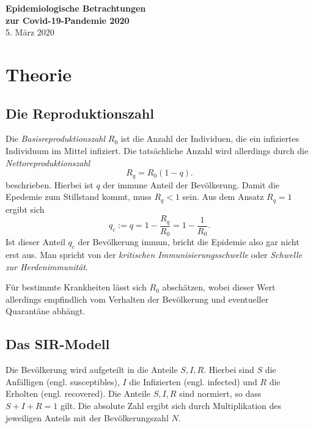 \documentclass[a4paper,11pt,fleqn,twocolumn,twoside,dvipdfmx]{scrartcl}
\numberwithin{equation}{section}
\begin{document}
\noindent
{\Large\textbf{Epidemiologische Betrachtungen\\
zur Covid-19-Pandemie 2020}}\\[4pt]
5. März 2020

\tableofcontents

\section{Theorie}

\subsection{Die Reproduktionszahl}

Die \emph{Basisreproduktionszahl} $R_0$ ist die Anzahl der Individuen,
die ein infiziertes Individuum im Mittel infiziert. Die tatsächliche
Anzahl wird allerdings durch die \emph{Nettoreproduktionszahl}%
\begin{equation}\label{eq:Nettoreproduktionszahl}
R_q = R_0(1-q).
\end{equation}
beschrieben. Hierbei ist $q$ der immune Anteil der Bevölkerung.
Damit die Epedemie zum Stillstand kommt, muss $R_q<1$ sein.
Aus dem Ansatz $R_q=1$ ergibt sich%
\begin{equation}
q_c := q = 1-\frac{R_q}{R_0} = 1-\frac{1}{R_0}.
\end{equation}
Ist dieser Anteil $q_c$ der Bevölkerung immun, bricht die Epidemie
also gar nicht erst aus. Man spricht von der
\emph{kritischen Immunisierungsschwelle} oder \emph{Schwelle
zur Herdenimmunität}.

Für bestimmte Krankheiten lässt sich $R_0$ abschätzen, wobei
dieser Wert allerdings empfindlich vom Verhalten der Bevölkerung und
eventueller Quarantäne abhängt.


\subsection{Das SIR-Modell}

Die Bevölkerung wird aufgeteilt in die Anteile $S,I,R$. Hierbei sind
$S$ die Anfälligen (engl. susceptibles), $I$ die Infizierten (engl.
infected) und $R$ die Erholten (engl. recovered). Die Anteile
$S,I,R$ sind normiert, so dass $S+I+R=1$ gilt. Die absolute Zahl
ergibt sich durch Multiplikation des jeweiligen Anteils mit der
Bevölkerungszahl $N$.
\end{document}
